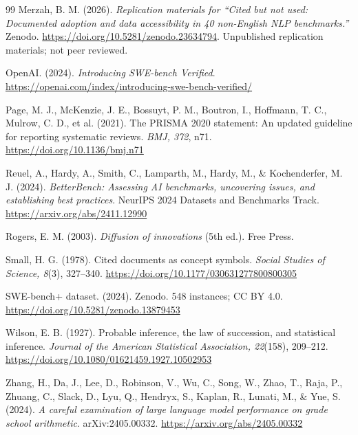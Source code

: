 \documentclass[11pt,a4paper]{article}
\begin{document}
\begin{thebibliography}{99}
Merzah, B. M. (2026). \emph{Replication materials for ``Cited but not used: Documented adoption and data accessibility in 40 non-English NLP benchmarks.''} Zenodo. \url{https://doi.org/10.5281/zenodo.23634794}. Unpublished replication materials; not peer reviewed.

OpenAI. (2024). \emph{Introducing SWE-bench Verified}. \url{https://openai.com/index/introducing-swe-bench-verified/}

Page, M. J., McKenzie, J. E., Bossuyt, P. M., Boutron, I., Hoffmann, T. C., Mulrow, C. D., et al. (2021). The PRISMA 2020 statement: An updated guideline for reporting systematic reviews. \emph{BMJ, 372}, n71. \url{https://doi.org/10.1136/bmj.n71}

Reuel, A., Hardy, A., Smith, C., Lamparth, M., Hardy, M., \& Kochenderfer, M. J. (2024). \emph{BetterBench: Assessing AI benchmarks, uncovering issues, and establishing best practices}. NeurIPS 2024 Datasets and Benchmarks Track. \url{https://arxiv.org/abs/2411.12990}

Rogers, E. M. (2003). \emph{Diffusion of innovations} (5th ed.). Free Press.

Small, H. G. (1978). Cited documents as concept symbols. \emph{Social Studies of Science, 8}(3), 327--340. \url{https://doi.org/10.1177/030631277800800305}

SWE-bench+ dataset. (2024). Zenodo. 548 instances; CC BY 4.0. \url{https://doi.org/10.5281/zenodo.13879453}

Wilson, E. B. (1927). Probable inference, the law of succession, and statistical inference. \emph{Journal of the American Statistical Association, 22}(158), 209--212. \url{https://doi.org/10.1080/01621459.1927.10502953}

Zhang, H., Da, J., Lee, D., Robinson, V., Wu, C., Song, W., Zhao, T., Raja, P., Zhuang, C., Slack, D., Lyu, Q., Hendryx, S., Kaplan, R., Lunati, M., \& Yue, S. (2024). \emph{A careful examination of large language model performance on grade school arithmetic}. arXiv:2405.00332. \url{https://arxiv.org/abs/2405.00332}

\end{thebibliography}
\end{document}
